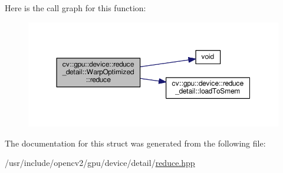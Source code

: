 Here is the call graph for this function\-:\nopagebreak
\begin{figure}[H]
\begin{center}
\leavevmode
\includegraphics[width=350pt]{structcv_1_1gpu_1_1device_1_1reduce__detail_1_1WarpOptimized_abdb3ddd80af6c6e12b19d3752c4eb90e_cgraph}
\end{center}
\end{figure}




The documentation for this struct was generated from the following file\-:\begin{DoxyCompactItemize}
\item 
/usr/include/opencv2/gpu/device/detail/\hyperlink{detail_2reduce_8hpp}{reduce.\-hpp}\end{DoxyCompactItemize}
